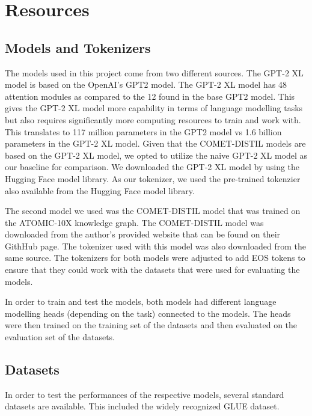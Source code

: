 \documentclass[\main/thesis.tex]{subfiles}
\begin{document}
\chapter{Resources}\label{sec:resources} 


\section{Models and Tokenizers}\label{sec:models}

The models used in this project come from two different sources. The GPT-2 XL model is based on the OpenAI's GPT2 
model\cite{radford_language_nodate}. The GPT-2 XL model has 48 attention modules as compared to the 12 found in the base 
GPT2 model. This gives the GPT-2 XL model more capability in terms of language modelling tasks but also requires 
significantly more computing resources to train and work with\cite{noauthor_pretrained_nodate}. This translates to 117 
million parameters in the GPT2 model vs 1.6 billion parameters in the GPT-2 XL model. Given that the COMET-DISTIL models
are based on the GPT-2 XL model, we opted to utilize the naive GPT-2 XL model as our baseline for comparison. We 
downloaded the GPT-2 XL model by using the Hugging Face model library\cite{noauthor_gpt2-xl_nodate}. As our tokenizer, we 
used the pre-trained tokenzier also available from the Hugging Face model library\cite{noauthor_gpt2-xl_nodate}. 

The second model we used was the COMET-DISTIL model\cite{west_symbolic_2021} that was trained on the ATOMIC-10X 
knowledge graph. The COMET-DISTIL model was downloaded from the author's provided website that can be found on their 
GithHub page\cite{peterwestai2_symbolic_2022}. The tokenizer used with this model was also downloaded from the same 
source. The tokenizers for both models were adjusted to add EOS tokens to ensure that they could work with the datasets 
that were used for evaluating the models. 

In order to train and test the models, both models had different language modelling heads (depending on the task) 
connected to the models. The heads were then trained on the training set of the datasets and then evaluated on 
the evaluation set of the datasets. 

\section{Datasets}\label{sec:datasets}
In order to test the performances of the respective models, several standard datasets are available. This 
included the widely recognized GLUE dataset\cite{wang_glue_2019}. 
\end{document}
